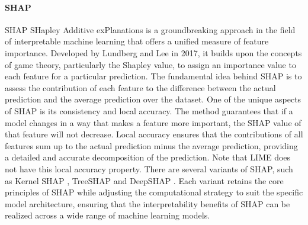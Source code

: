 \documentclass[mnsc,blindrev]{informs3}
\begin{document}
\paragraph{SHAP}
SHAP SHapley Additive exPlanations is a groundbreaking approach in the field of interpretable machine learning that offers a unified measure of feature importance. Developed by Lundberg and Lee in 2017, it builds upon the concepts of game theory, particularly the Shapley value, to assign an importance value to each feature for a particular prediction. The fundamental idea behind SHAP is to assess the contribution of each feature to the difference between the actual prediction and the average prediction over the dataset. One of the unique aspects of SHAP is its consistency and local accuracy. The method guarantees that if a model changes in a way that makes a feature more important, the SHAP value of that feature will not decrease. Local accuracy ensures that the contributions of all features sum up to the actual prediction minus the average prediction, providing a detailed and accurate decomposition of the prediction. Note that LIME does not have this local accuracy property. There are several variants of SHAP, such as Kernel SHAP \citep{lundberg17shap}, TreeSHAP \citep{lundberg2018consistent} and DeepSHAP \citep{lundberg17shap}. Each variant retains the core principles of SHAP while adjusting the computational strategy to suit the specific model architecture, ensuring that the interpretability benefits of SHAP can be realized across a wide range of machine learning models.

    
\end{document}
